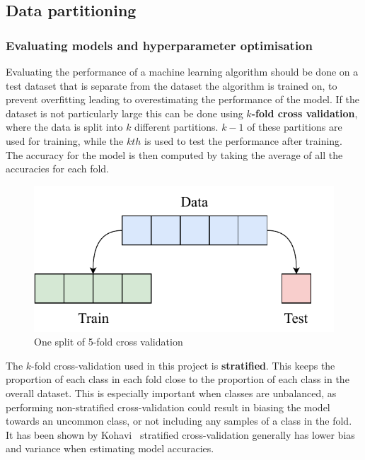 \subsection{Data partitioning} \label{part}
\subsubsection{Evaluating models and hyperparameter optimisation}
Evaluating the performance of a machine learning algorithm should be done on a test dataset that is separate from the dataset the 
algorithm is trained on, to prevent overfitting leading to overestimating the performance of the model. If the dataset is not particularly 
large this can be done using 
\textbf{$k$-fold cross validation}, where the data is split into $k$ different partitions. $k-1$ of these partitions are used for training, 
while the $kth$ is used to test the performance after training. The accuracy for the model is then computed by taking the average of all
the accuracies for each fold.

\begin{figure}[H]
  \centering
  \includegraphics[scale=0.75]{figs/k_fold.pdf}
  \caption{One split of 5-fold cross validation}
\end{figure}

The $k$-fold cross-validation used in this project is \textbf{stratified}. This keeps the proportion of each class in each fold
close to the proportion of each class in the overall dataset. This is especially important when classes are unbalanced, as performing 
non-stratified cross-validation could result in biasing the model towards an uncommon class, or not including any samples of a class in the 
fold. It has been shown by Kohavi~\cite{Kohavi:1995:SCB:1643031.1643047} stratified cross-validation generally has lower bias and variance when estimating model 
accuracies.

